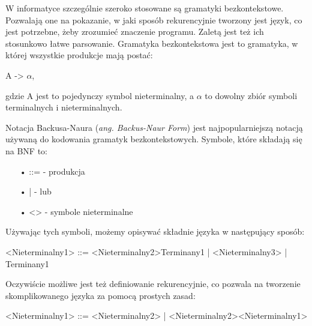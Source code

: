 W informatyce szczególnie szeroko stosowane są gramatyki bezkontekstowe. Pozwalają one na pokazanie, w jaki sposób rekurencyjnie tworzony jest język, co jest potrzebne, żeby zrozumieć znaczenie programu. Zaletą jest też ich stosunkowo łatwe parsowanie.
Gramatyka bezkontekstowa jest to gramatyka, w której wszystkie produkcje mają postać:
\begin{center}
	A -> {$\alpha$},
\end{center}
gdzie A jest to pojedynczy symbol nieterminalny, a $\alpha$ to dowolny zbiór symboli terminalnych i nieterminalnych.
	
Notacja Backusa-Naura (\textit{ang. Backus-Naur Form}) \cite{Backus1959TheSA}\cite{Naur}\cite{Knuth1964} jest najpopularniejszą notacją używaną do kodowania gramatyk bezkontekstowych. Symbole, które składają się na BNF to:

\begin{itemize}
  \item[•] ::= - produkcja
  \item[•] |   - lub
  \item[•] <>  - symbole nieterminalne
\end{itemize}

Używając tych symboli, możemy opisywać składnie języka w następujący sposób:
\begin{center}
<Nieterminalny1> ::= <Nieterminalny2>Terminany1 | <Nieterminalny3> | Terminany1
\end{center}
Oczywiście możliwe jest też definiowanie rekurencyjnie, co pozwala na tworzenie skomplikowanego języka za pomocą prostych zasad: 
\begin{center}
<Nieterminalny1> ::= <Nieterminalny2> | <Nieterminalny2><Nieterminalny1>
\end{center}

